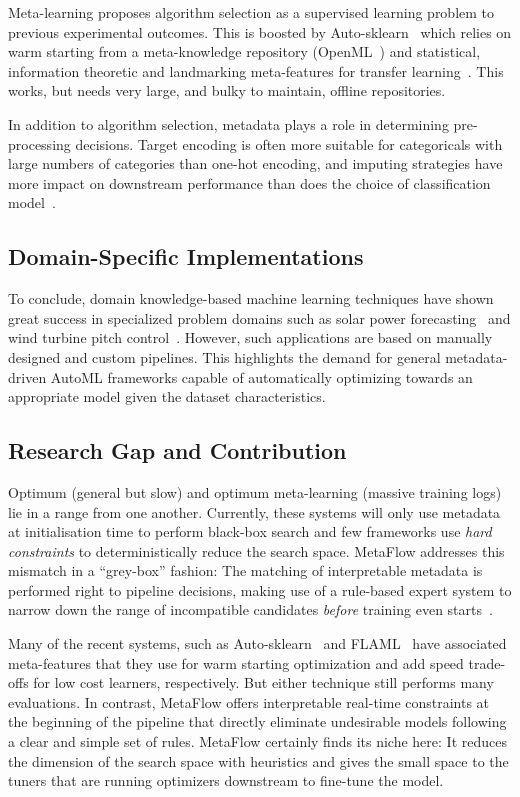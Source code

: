 \documentclass[runningheads]{llncs}
\begin{document}
Meta-learning proposes algorithm selection as a supervised learning problem to previous experimental outcomes. This is boosted by Auto-sklearn~\cite{feurer2015efficient} which relies on warm starting from a meta-knowledge repository (OpenML~\cite{vanschoren2013openml}) and statistical, information theoretic and landmarking meta-features for transfer learning~\cite{leite2012survey}. This works, but needs very large, and bulky to maintain, offline repositories.

In addition to algorithm selection, metadata plays a role in determining pre-processing decisions. Target encoding is often more suitable for categoricals with large numbers of categories than one-hot encoding, and imputing strategies have more impact on downstream performance than does the choice of classification model~\cite{li2021cleanml}.

\subsection{Domain-Specific Implementations}
To conclude, domain knowledge-based machine learning techniques have shown great success in specialized problem domains such as solar power forecasting~\cite{dhaked2023power} and wind turbine pitch control~\cite{narayanan2024improved}. However, such applications are based on manually designed and custom pipelines. This highlights the demand for general metadata-driven AutoML frameworks capable of automatically optimizing towards an appropriate model given the dataset characteristics.

\subsection{Research Gap and Contribution}
Optimum (general but slow) and optimum meta-learning (massive training logs) lie in a range from one another. Currently, these systems will only use metadata at initialisation time to perform black-box search and few frameworks use \emph{hard constraints} to deterministically reduce the search space. MetaFlow addresses this mismatch in a ``grey-box'' fashion: The matching of interpretable metadata is performed right to pipeline decisions, making use of a rule-based expert system to narrow down the range of incompatible candidates \emph{before} training even starts~\cite{hutter2019automated}.

Many of the recent systems, such as Auto-sklearn~\cite{feurer2015efficient} and FLAML~\cite{wang2021flaml} have associated meta-features that they use for warm starting optimization and add speed trade-offs for low cost learners, respectively. But either technique still performs many evaluations. In contrast, MetaFlow offers interpretable real-time constraints at the beginning of the pipeline that directly eliminate undesirable models following a clear and simple set of rules. MetaFlow certainly finds its niche here: It reduces the dimension of the search space with heuristics and gives the small space to the tuners that are running optimizers downstream to fine-tune the model.
\end{document}
